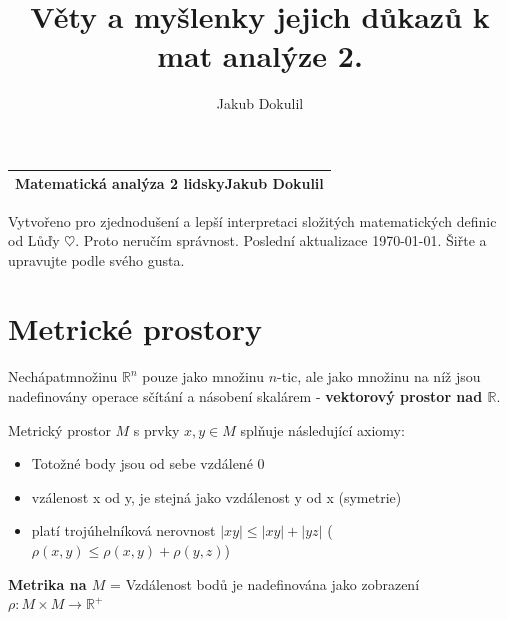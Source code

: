\documentclass[a4paper, twoside,%
12pt]{article}
\author{Jakub Dokulil}
\title{Věty a myšlenky jejich důkazů k mat analýze 2.}
\newcommand{\R}{\mathbb{R}}
\begin{document}
\begin{table}[h!]
\begin{tabular}{p{}}
    \textsf{\huge{Matematická analýza 2 lidsky}}\newline \textsf{\textbf{\Large Jakub Dokulil}}\\
    \hline
\end{tabular}
\end{table}

\noindent\textsf{Vytvořeno pro zjednodušení a lepší interpretaci složitých matematických definic od Lůďy $\heartsuit$. Proto neručím správnost. Poslední aktualizace \today. Šiřte a upravujte podle svého gusta.}

\tableofcontents

\section{Metrické prostory}

Nechápatmnožinu $\R ^n$ pouze jako množinu $n$-tic, ale jako množinu na níž jsou nadefinovány operace sčítání a násobení skalárem - \textbf{vektorový prostor nad $\R$}.

Metrický prostor $M$ s prvky $x,y \in M$ splňuje následující axiomy:
\begin{itemize}
    \item Totožné body jsou od sebe vzdálené 0
    \item vzálenost x od y, je stejná jako vzdálenost y od x (symetrie)
    \item platí trojúhelníková nerovnost $|xy|\leq |xy| + |yz| $ ($\rho(x,y)\leq \rho(x,y) + \rho(y,z) $)
\end{itemize}
\textbf{Metrika na $M$} = Vzdálenost bodů je nadefinována jako zobrazení $\rho: M\times M \rightarrow \R^+$
\end{document}
